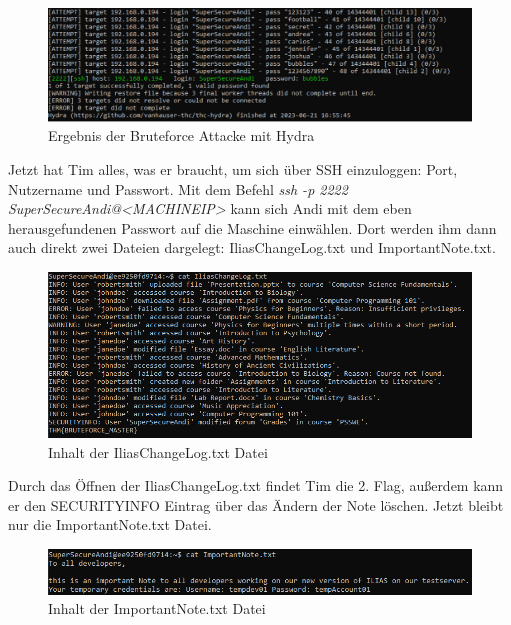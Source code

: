 \documentclass[10pt, a4paper,onecolumn ,titlepage]{article}
\begin{document}
    \begin{figure}[H]
        \centering
        \includegraphics[width=1\textwidth]{VM1_Bilder/HydraBruteforce.PNG}
        \caption{Ergebnis der Bruteforce Attacke mit Hydra}
        \label{fig:HydraBruteforce}
    \end{figure}

    \noindent
    Jetzt hat Tim alles, was er braucht, um sich über SSH einzuloggen:
    Port, Nutzername und Passwort. Mit dem Befehl \textit{ssh -p 2222 SuperSecureAndi@<MACHINEIP>} kann sich Andi mit dem eben herausgefundenen Passwort auf die Maschine einwählen.
    Dort werden ihm dann auch direkt zwei Dateien dargelegt: IliasChangeLog.txt und ImportantNote.txt.

    \begin{figure}[H]
        \centering
        \includegraphics[width=1\textwidth]{VM1_Bilder/IliasChangelog.PNG}
        \caption{Inhalt der IliasChangeLog.txt Datei}
        \label{fig:IliasChangelog}
    \end{figure}

    \noindent
    Durch das Öffnen der IliasChangeLog.txt findet Tim die 2. Flag, außerdem kann er den SECURITYINFO Eintrag über das Ändern der Note löschen. Jetzt bleibt nur die
    ImportantNote.txt Datei.

    \begin{figure}[H]
        \centering
        \includegraphics[width=1\textwidth]{VM1_Bilder/ImportantNote.PNG}
        \caption{Inhalt der ImportantNote.txt Datei}
        \label{fig:ImportantNote}
    \end{figure}
\end{document}
